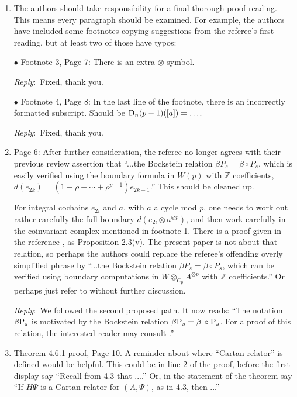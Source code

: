 \documentclass{amsart}
\newcommand{\ar}{\medskip\noindent\textit{Reply}:\ }
\def\subitem{\medskip\noindent$\bullet$ }
\begin{document}
\begin{enumerate}
	\item The authors should take responsibility for a final thorough proof-reading. This means every paragraph should be examined. For example, the authors have included some footnotes copying suggestions from the referee’s first reading, but at least two of those have typos:

	\subitem Footnote 3, Page 7: There is an extra $\otimes$ symbol.

	\ar Fixed, thank you.

	\subitem Footnote 4, Page 8: In the last line of the footnote, there is an incorrectly formatted subscript. Should be $\mathrm{D}_n(p-1)([a]) = \ldots$.

	\ar Fixed, thank you.

	\item Page 6: After further consideration, the referee no longer agrees with their previous review assertion that “...the Bockstein relation $\beta P_s = \beta \circ P_s$, which is easily verified using the boundary formula in $W(p)$ with $\mathbb{Z}$ coefficients, $d(e_{2k}) = (1 + \rho + \cdots + \rho^{p-1})e_{2k-1}$.” This should be cleaned up.

	For integral cochains $e_{2i}$ and $a$, with $a$ a cycle mod $p$, one needs to work out rather carefully the full boundary $d(e_{2i} \otimes a^{\otimes p})$, and then work carefully in the coinvariant complex mentioned in footnote 1. There is a proof given in the reference \cite{May70}, as Proposition 2.3(v). The present paper is not about that relation, so perhaps the authors could replace the referee’s offending overly simplified phrase by “...the Bockstein relation $\beta P_s = \beta \circ P_s$, which can be verified using boundary computations in $W \otimes_{C_p} A^{\otimes p}$ with $\mathbb{Z}$ coefficients.” Or perhaps just refer to \cite{May70} without further discussion.

	\ar We followed the second proposed path. It now reads: ``The notation $\beta \mathrm{P}_s$ is motivated by the Bockstein relation $\beta \mathrm{P}_s = \beta\, \mathbin{\circ} \mathrm{P}_s$.
	For a proof of this relation, the interested reader may consult \cite[Prop.~2.3(v)]{may1970general}.''

	\item Theorem 4.6.1 proof, Page 10. A reminder about where “Cartan relator” is defined would be helpful. This could be in line 2 of the proof, before the first display say “Recall from 4.3 that ....” Or, in the statement of the theorem say “If $H\Psi$ is a Cartan relator for $(A,\Psi)$, as in 4.3, then ...”


\end{enumerate}
\end{document}
